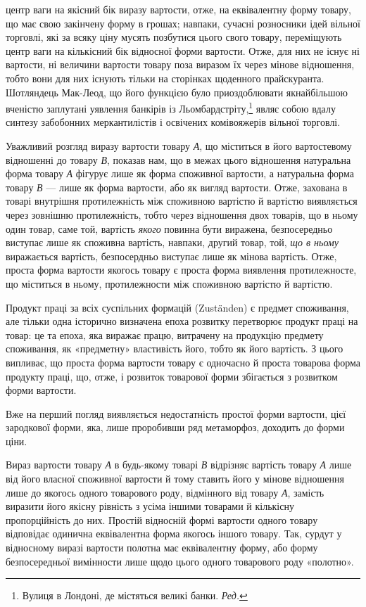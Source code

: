 \parcont{}  %
центр ваги на якісний бік виразу вартости, отже, на еквівалентну
форму товару, що має свою закінчену форму в грошах; навпаки,
сучасні розносники ідей вільної торговлі, які за всяку ціну мусять
позбутися цього свого товару, переміщують центр ваги на
кількісний бік відносної форми вартости. Отже, для них не існує
ні вартости, ні величини вартости товару поза виразом їх через
мінове відношення, тобто вони для них існують тільки на сторінках
щоденного прайскуранта. Шотляндець Мак-Леод, що його
функцією було приоздоблювати якнайбільшою вченістю заплутані
уявлення банкірів із Льомбардстріту,\footnote*{
Вулиця в Лондоні, де містяться великі банки. \emph{Ред.}
} являє собою вдалу синтезу
забобонних меркантилістів і освічених комівояжерів вільної
торговлі.

Уважливий розгляд виразу вартости товару \emph{А}, що міститься
в його вартостевому відношенні до товару \emph{В}, показав нам, що
в межах цього відношення натуральна форма товару \emph{А} фігурує
лише як форма споживної вартости, а натуральна форма товару
\emph{В} — лише як форма вартости, або як вигляд вартости. Отже,
захована в товарі внутрішня протилежність між споживною вартістю
й вартістю виявляється через зовнішню протилежність, тобто
через відношення двох товарів, що в ньому один товар, саме той,
вартість \emph{якого} повинна бути виражена, безпосередньо виступає
лише як споживна вартість, навпаки, другий товар, той, \emph{що в
ньому} виражається вартість, безпосердньо виступає лише як
мінова вартість. Отже, проста форма вартости якогось товару
є проста форма виявлення протилежносте, що міститься в ньому,
протилежности між споживною вартістю й вартістю.

Продукт праці за всіх суспільних формацій (Zuständen) є
предмет споживання, але тільки одна історично визначена епоха
розвитку перетворює продукт праці на товар: це та епоха, яка
виражає працю, витрачену на продукцію предмету споживання,
як «предметну» властивість його, тобто як його вартість. З цього
випливає, що проста форма вартости товару є одночасно й проста
товарова форма продукту праці, що, отже, і розвиток товарової
форми збігається з розвитком форми вартости.

Вже на перший погляд виявляється недостатність простої
форми вартости, цієї зародкової форми, яка, лише проробивши
ряд метаморфоз, доходить до форми ціни.

Вираз вартости товару \emph{А} в будь-якому товарі \emph{В} відрізняє
вартість товару \emph{А} лише від його власної споживної вартости й
тому ставить його у мінове відношення лише до якогось одного
товарового роду, відмінного від товару \emph{А}, замість виразити його
якісну рівність з усіма іншими товарами й кількісну пропорційність
до них. Простій відносній формі вартости одного товару відповідає
одинична еквівалентна форма якогось іншого товару.
Так, сурдут у відносному виразі вартости полотна має еквівалентну
форму, або форму безпосередньої вимінности лише щодо
цього одного товарового роду «полотно».
